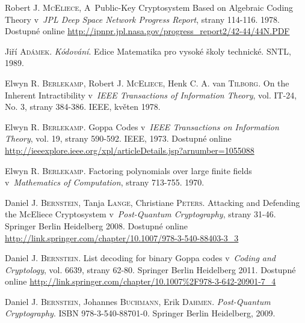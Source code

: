 \documentclass[thesis=M,czech,hidelinks]{FITthesis}[2012/06/26]
\newcommand{\0}{{\textcolor[gray]{0.75}{0}}}
\begin{document}
%
%
\begin{thebibliography}{99}


        Robert J. \textsc{McEliece}, A~Public-Key Cryptosystem Based on
        Algebraic Coding Theory v~\emph{JPL Deep Space Network Progress Report},
        strany 114-116. 1978. Dostupné online
        \url{http://ipnpr.jpl.nasa.gov/progress_report2/42-44/44N.PDF}

        Jiří \textsc{Adámek}. \emph{Kódování}. Edice Matematika pro vysoké školy
        technické. SNTL, 1989.

        Elwyn R. \textsc{Berlekamp}, Robert J. \textsc{McEliece}, Henk C. A. van
        \textsc{Tilborg}.  On the Inherent Intractibility v~\emph{IEEE
        Transactions of Information Theory}, vol. IT-24, No. 3, strany 384-386.
        IEEE, květen 1978.

        Elwyn R. \textsc{Berlekamp}. Goppa Codes v~\emph{IEEE Transactions on
        Information Theory}, vol. 19, strany 590-592. IEEE, 1973. Dostupné
        online
        \url{http://ieeexplore.ieee.org/xpl/articleDetails.jsp?arnumber=1055088}

        Elwyn R. \textsc{Berlekamp}. Factoring polynomials over large finite
        fields v~\emph{Mathematics of Computation}, strany 713-755. 1970.

        Daniel J. \textsc{Bernstein}, Tanja \textsc{Lange}, Christiane
        \textsc{Peters}. Attacking and Defending the McEliece Cryptosystem
        v~\emph{Post-Quantum Cryptography}, strany 31-46. Springer Berlin
        Heidelberg 2008. Dostupné online
        \url{http://link.springer.com/chapter/10.1007/978-3-540-88403-3\_3}

        Daniel J. \textsc{Bernstein}. List decoding for binary Goppa codes
        v~\emph{Coding and Cryptology}, vol. 6639, strany 62-80. Springer Berlin
        Heidelberg 2011. Dostupné online
        \url{http://link.springer.com/chapter/10.1007\%2F978-3-642-20901-7\_4}

        Daniel J. \textsc{Bernstein}, Johannes \textsc{Buchmann}, Erik
        \textsc{Dahmen}. \emph{Post-Quantum Cryptography}. ISBN
        978-3-540-88701-0.  Springer Berlin Heidelberg, 2009.


\end{thebibliography}
\end{document}
